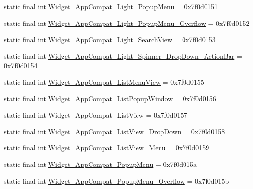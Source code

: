 \begin{DoxyCompactItemize}
static final int \mbox{\hyperlink{classandroid_1_1support_1_1v7_1_1appcompat_1_1_r_1_1style_a7a5a45143d9d2b8450d944430e6da1dc}{Widget\+\_\+\+App\+Compat\+\_\+\+Light\+\_\+\+Popup\+Menu}} = 0x7f0d0151
\item 
static final int \mbox{\hyperlink{classandroid_1_1support_1_1v7_1_1appcompat_1_1_r_1_1style_a8fd24e81a530ef4c300f29f6c046d707}{Widget\+\_\+\+App\+Compat\+\_\+\+Light\+\_\+\+Popup\+Menu\+\_\+\+Overflow}} = 0x7f0d0152
\item 
static final int \mbox{\hyperlink{classandroid_1_1support_1_1v7_1_1appcompat_1_1_r_1_1style_a9f6f0009b817cabb1dafecf4b0c724c3}{Widget\+\_\+\+App\+Compat\+\_\+\+Light\+\_\+\+Search\+View}} = 0x7f0d0153
\item 
static final int \mbox{\hyperlink{classandroid_1_1support_1_1v7_1_1appcompat_1_1_r_1_1style_a98acdcba1fa055bc28faa0fc74c7076a}{Widget\+\_\+\+App\+Compat\+\_\+\+Light\+\_\+\+Spinner\+\_\+\+Drop\+Down\+\_\+\+Action\+Bar}} = 0x7f0d0154
\item 
static final int \mbox{\hyperlink{classandroid_1_1support_1_1v7_1_1appcompat_1_1_r_1_1style_a5d112506c796702ee241f523e76af8ce}{Widget\+\_\+\+App\+Compat\+\_\+\+List\+Menu\+View}} = 0x7f0d0155
\item 
static final int \mbox{\hyperlink{classandroid_1_1support_1_1v7_1_1appcompat_1_1_r_1_1style_ad2af4cc0425e1ade5f5e5468ea0f6097}{Widget\+\_\+\+App\+Compat\+\_\+\+List\+Popup\+Window}} = 0x7f0d0156
\item 
static final int \mbox{\hyperlink{classandroid_1_1support_1_1v7_1_1appcompat_1_1_r_1_1style_a1ceeced9a6c41e73bebf6d3531b7f05a}{Widget\+\_\+\+App\+Compat\+\_\+\+List\+View}} = 0x7f0d0157
\item 
static final int \mbox{\hyperlink{classandroid_1_1support_1_1v7_1_1appcompat_1_1_r_1_1style_afae0a0c13593ec0b5f020075de5706a0}{Widget\+\_\+\+App\+Compat\+\_\+\+List\+View\+\_\+\+Drop\+Down}} = 0x7f0d0158
\item 
static final int \mbox{\hyperlink{classandroid_1_1support_1_1v7_1_1appcompat_1_1_r_1_1style_a4323c3c0ee6ee31e74863ada981eeeb5}{Widget\+\_\+\+App\+Compat\+\_\+\+List\+View\+\_\+\+Menu}} = 0x7f0d0159
\item 
static final int \mbox{\hyperlink{classandroid_1_1support_1_1v7_1_1appcompat_1_1_r_1_1style_ad3c806ce88489c9b3ef74ba1395ced31}{Widget\+\_\+\+App\+Compat\+\_\+\+Popup\+Menu}} = 0x7f0d015a
\item 
static final int \mbox{\hyperlink{classandroid_1_1support_1_1v7_1_1appcompat_1_1_r_1_1style_a16c6dbc6371fa5e4d0cf07f332d50896}{Widget\+\_\+\+App\+Compat\+\_\+\+Popup\+Menu\+\_\+\+Overflow}} = 0x7f0d015b

\end{DoxyCompactItemize}
